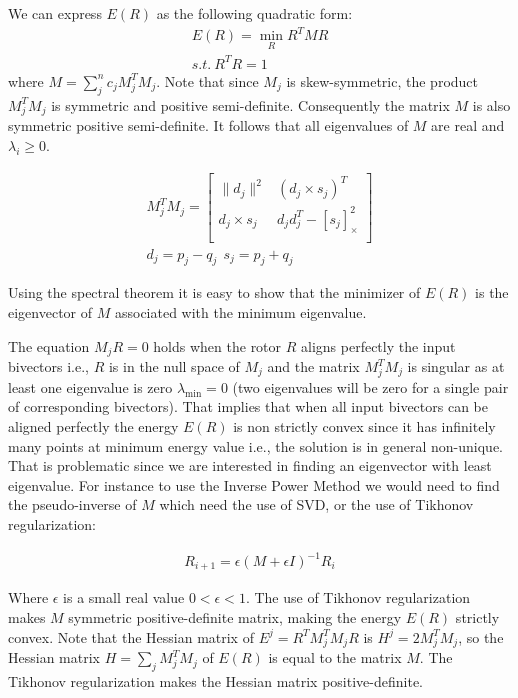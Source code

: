 \documentclass{birkjour}
\numberwithin{equation}{section}
\begin{document}
We can express $E(R)$ as the following quadratic form:
\begin{eqnarray*}
E(R) = \min_R R^T M R\\
s.t. \ R^T R = 1
\end{eqnarray*}
where $M = \sum_j^n { c_j M_j^T M_j}$. Note that since $M_j$ is skew-symmetric, the product $M_j^T M_j$ is symmetric and positive semi-definite.
Consequently the matrix $M$ is also symmetric positive semi-definite. It follows that all eigenvalues of $M$ are real and $\lambda_i \geq 0$.

\begin{eqnarray*}
M_j^T M_j = 
\left[\begin{array}{cc}
\| d_j \|^2       &         (d_j \times s_j)^T \\
d_j \times s_j  & d_j d_j^T - \left[ s_j \right]^2_\times \\
\end{array}\right]\\
d_j = p_j - q_j \ \ s_j = p_j + q_j
\end{eqnarray*}

Using the spectral theorem it is easy to show that the minimizer of $E(R)$ is the eigenvector of $M$ associated with the minimum eigenvalue.

The equation $M_j R = 0$ holds when the rotor $R$ aligns perfectly the input bivectors i.e., $R$ is in the null space of $M_j$ and the matrix $M_j^T M_j$ is singular as at least one eigenvalue is zero $\lambda_{\min} = 0$ (two eigenvalues will be zero for a single pair of corresponding bivectors). That implies that when all input bivectors can be aligned perfectly the energy $E(R)$ is non strictly convex since it has infinitely many points at minimum energy value i.e., the solution is in general non-unique. That is problematic since we are interested in finding an eigenvector with least eigenvalue. For instance to use the Inverse Power Method we would need to find the pseudo-inverse of $M$ which need the use of SVD, or the use of Tikhonov regularization:

\begin{eqnarray*}
	R_{i+1} = \epsilon (M + \epsilon I)^{-1} R_i
\end{eqnarray*}

Where $\epsilon$ is a small real value $0 < \epsilon < 1$. The use of Tikhonov regularization makes $M$ symmetric positive-definite matrix, making the energy $E(R)$ strictly convex. Note that the Hessian matrix of $E^j = R^T M_j^T M_j R$ is $H^j = 2 M_j^T M_j$, so the Hessian matrix $H = \sum_j {M_j^T M_j}$ of $E(R)$ is equal to the matrix $M$. The Tikhonov regularization makes the Hessian matrix positive-definite.
\end{document}
